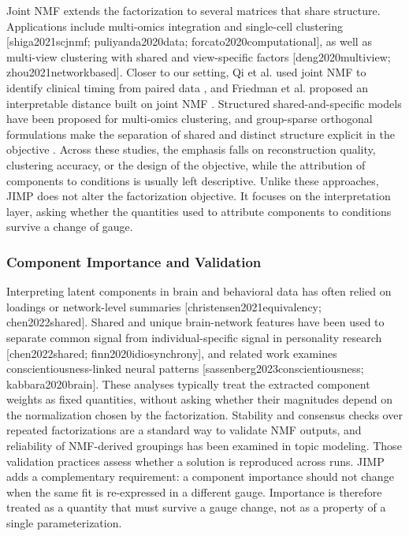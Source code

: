 \documentclass{article}
\begin{document}
Joint NMF extends the factorization to several matrices that share structure. Applications include multi-omics integration and single-cell clustering [shiga2021scjnmf; puliyanda2020data; forcato2020computational], as well as multi-view clustering with shared and view-specific factors [deng2020multiview; zhou2021networkbased]. Closer to our setting, Qi et al. used joint NMF to identify clinical timing from paired data \cite{qi2022improved}, and Friedman et al. proposed an interpretable distance built on joint NMF \cite{friedman2023interpretable}. Structured shared-and-specific models have been proposed for multi-omics clustering, and group-sparse orthogonal formulations make the separation of shared and distinct structure explicit in the objective \cite{peng2020group}. Across these studies, the emphasis falls on reconstruction quality, clustering accuracy, or the design of the objective, while the attribution of components to conditions is usually left descriptive. Unlike these approaches, JIMP does not alter the factorization objective. It focuses on the interpretation layer, asking whether the quantities used to attribute components to conditions survive a change of gauge.

\subsubsection{Component Importance and Validation}

\label{sec:component_importance_and_validation}

Interpreting latent components in brain and behavioral data has often relied on loadings or network-level summaries [christensen2021equivalency; chen2022shared]. Shared and unique brain-network features have been used to separate common signal from individual-specific signal in personality research [chen2022shared; finn2020idiosynchrony], and related work examines conscientiousness-linked neural patterns [sassenberg2023conscientiousness; kabbara2020brain]. These analyses typically treat the extracted component weights as fixed quantities, without asking whether their magnitudes depend on the normalization chosen by the factorization. Stability and consensus checks over repeated factorizations are a standard way to validate NMF outputs, and reliability of NMF-derived groupings has been examined in topic modeling. Those validation practices assess whether a solution is reproduced across runs. JIMP adds a complementary requirement: a component importance should not change when the same fit is re-expressed in a different gauge. Importance is therefore treated as a quantity that must survive a gauge change, not as a property of a single parameterization.
\end{document}
